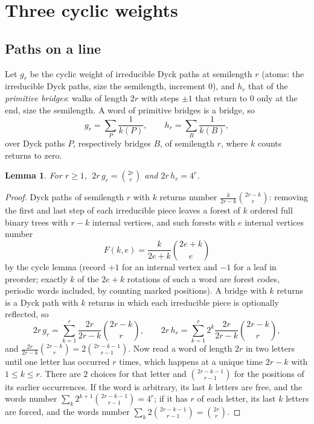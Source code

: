 \documentclass[11pt]{amsart}
\newtheorem{lemma}[theorem]{Lemma}
\theoremstyle{definition}
\theoremstyle{remark}
\begin{document}
\section{Three cyclic weights}\label{sec:weights}

\subsection*{Paths on a line} Let $g_r$ be the cyclic weight of irreducible Dyck paths at semilength $r$ (atoms: the
irreducible Dyck paths, size the semilength, increment $0$), and $h_r$ that of the \emph{primitive bridges}: walks of
length $2r$ with steps $\pm1$ that return to $0$ only at the end, size the semilength. A word of primitive bridges is
a bridge, so
\[
  g_r=\sum_{P}\frac1{k(P)},\qquad h_r=\sum_{B}\frac1{k(B)},
\]
over Dyck paths $P$, respectively bridges $B$, of semilength $r$, where $k$ counts returns to zero.

\begin{lemma}\label{lem:gh}
For $r\ge1$, $\ 2r\,g_r=\binom{2r}r$ and $2r\,h_r=4^r$.
\end{lemma}

\begin{proof}
Dyck paths of semilength $r$ with $k$ returns number $\frac{k}{2r-k}\binom{2r-k}{r}$: removing the first and last step
of each irreducible piece leaves a forest of $k$ ordered full binary trees with $r-k$ internal vertices, and such
forests with $e$ internal vertices number
\begin{equation}\label{eq:forest}
  F(k,e)=\frac{k}{2e+k}\binom{2e+k}{e}
\end{equation}
by the cycle lemma (record $+1$ for an internal vertex and $-1$ for a leaf in preorder; exactly $k$ of the $2e+k$
rotations of such a word are forest codes, periodic words included, by counting marked positions). A bridge with $k$
returns is a Dyck path with $k$ returns in which each irreducible piece is optionally reflected, so
\[
  2r\,g_r=\sum_{k=1}^r\frac{2r}{2r-k}\binom{2r-k}r,\qquad 2r\,h_r=\sum_{k=1}^r2^k\frac{2r}{2r-k}\binom{2r-k}r,
\]
and $\frac{2r}{2r-k}\binom{2r-k}{r}=2\binom{2r-k-1}{r-1}$. Now read a word of length $2r$ in two letters until one
letter has occurred $r$ times, which happens at a unique time $2r-k$ with $1\le k\le r$. There are $2$ choices for that
letter and $\binom{2r-k-1}{r-1}$ for the positions of its earlier occurrences. If the word is arbitrary, its last $k$
letters are free, and the words number $\sum_k2^{k+1}\binom{2r-k-1}{r-1}=4^r$; if it has $r$ of each letter, its last
$k$ letters are forced, and the words number $\sum_k2\binom{2r-k-1}{r-1}=\binom{2r}r$.
\end{proof}
\end{document}

